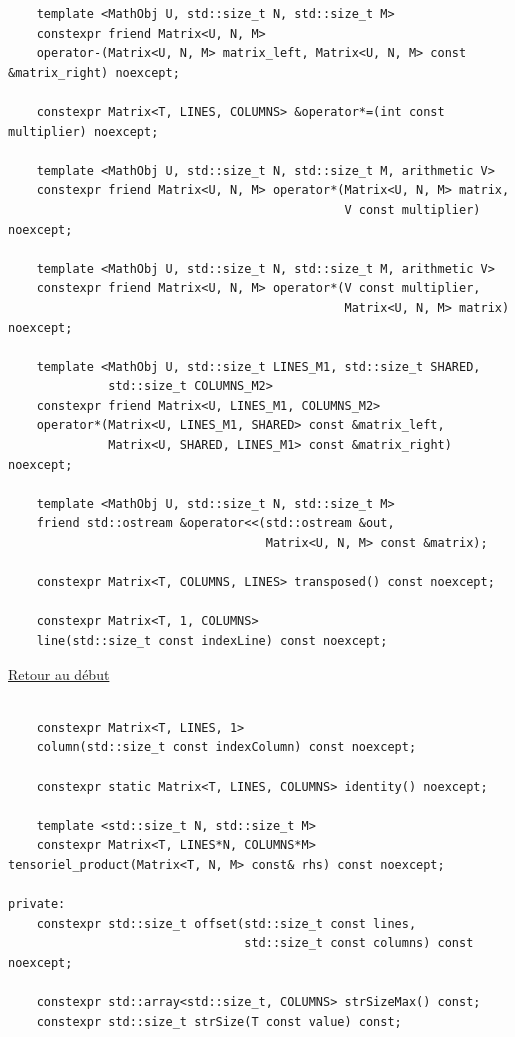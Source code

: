 {\begin{frame}[fragile]
\begin{verbatim}
	template <MathObj U, std::size_t N, std::size_t M>
	constexpr friend Matrix<U, N, M>
	operator-(Matrix<U, N, M> matrix_left, Matrix<U, N, M> const &matrix_right) noexcept;

	constexpr Matrix<T, LINES, COLUMNS> &operator*=(int const multiplier) noexcept;

	template <MathObj U, std::size_t N, std::size_t M, arithmetic V>
	constexpr friend Matrix<U, N, M> operator*(Matrix<U, N, M> matrix,
											   V const multiplier) noexcept;

	template <MathObj U, std::size_t N, std::size_t M, arithmetic V>
	constexpr friend Matrix<U, N, M> operator*(V const multiplier,
											   Matrix<U, N, M> matrix) noexcept;

	template <MathObj U, std::size_t LINES_M1, std::size_t SHARED,
			  std::size_t COLUMNS_M2>
	constexpr friend Matrix<U, LINES_M1, COLUMNS_M2>
	operator*(Matrix<U, LINES_M1, SHARED> const &matrix_left,
			  Matrix<U, SHARED, LINES_M1> const &matrix_right) noexcept;

	template <MathObj U, std::size_t N, std::size_t M>
	friend std::ostream &operator<<(std::ostream &out,
									Matrix<U, N, M> const &matrix);

	constexpr Matrix<T, COLUMNS, LINES> transposed() const noexcept;

	constexpr Matrix<T, 1, COLUMNS>
	line(std::size_t const indexLine) const noexcept;
\end{verbatim}
\end{frame}

\begin{frame}[fragile]
\hyperlink{conclusion}{Retour au début}\newline
\begin{verbatim}

	constexpr Matrix<T, LINES, 1>
	column(std::size_t const indexColumn) const noexcept;

	constexpr static Matrix<T, LINES, COLUMNS> identity() noexcept;

	template <std::size_t N, std::size_t M>
	constexpr Matrix<T, LINES*N, COLUMNS*M> tensoriel_product(Matrix<T, N, M> const& rhs) const noexcept;

private:
	constexpr std::size_t offset(std::size_t const lines,
								 std::size_t const columns) const noexcept;

	constexpr std::array<std::size_t, COLUMNS> strSizeMax() const;
	constexpr std::size_t strSize(T const value) const;


\end{verbatim}
\end{frame}}
